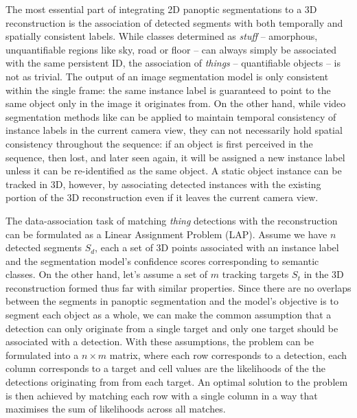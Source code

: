 



The most essential part of integrating 2D panoptic segmentations to a 3D reconstruction is the association of detected segments with both temporally and spatially consistent labels. While classes determined as \textit{stuff} -- amorphous, unquantifiable regions like sky, road or floor -- can always simply be associated with the same persistent ID, the association of \textit{things} -- quantifiable objects -- is not as trivial. The output of an image segmentation model is only consistent within the single frame: the same instance label is guaranteed to point to the same object only in the image it originates from. On the other hand, while video segmentation methods like \cite{video_panoptic_segmentation} can be applied to maintain temporal consistency of instance labels in the current camera view, they can not necessarily hold spatial consistency throughout the sequence: if an object is first perceived in the sequence, then lost, and later seen again, it will be assigned a new instance label unless it can be re-identified as the same object. A static object instance can be tracked in 3D, however, by associating detected instances with the existing portion of the 3D reconstruction even if it leaves the current camera view. 

The data-association task of matching \textit{thing} detections with the reconstruction can be formulated as a Linear Assignment Problem (LAP). Assume we have $n$ detected segments $S_d$, each a set of 3D points associated with an instance label and the segmentation model's confidence scores corresponding to semantic classes. On the other hand, let's assume a set of $m$ tracking targets $S_t$ in the 3D reconstruction formed thus far with similar properties. Since there are no overlaps between the segments in panoptic segmentation and the model's objective is to segment each object as a whole, we can make the common assumption that a detection can only originate from a single target and only one target should be associated with a detection. \cite{ab3dmot,two_stage_data_association,probabilistic_3d_mot} With these assumptions, the problem can be formulated into a $n \times m$ matrix, where each row corresponds to a detection, each column corresponds to a target and cell values are the likelihoods of the the detections originating from from each target. An optimal solution to the problem is then achieved by matching each row with a single column in a way that maximises the sum of likelihoods across all matches.

